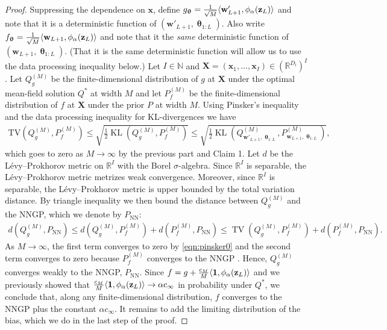 \documentclass[twoside]{article}
\renewcommand{\ss}[1]{_{\text{#1}}}
\newcommand{\vw}{\mathbf{w}}
\newcommand{\vx}{\mathbf{x}}
\newcommand{\vz}{\mathbf{z}}
\newcommand{\vtheta}{\bm{\uptheta}}
\newcommand{\vone}{\mathbf{1}}
\newcommand{\mX}{\mathbf{X}}
\renewcommand{\P}{\mathbb{P}}
\newcommand{\Q}{\mathbb{Q}}
\renewcommand{\Q}{\ensuremath{Q}}
\renewcommand{\P}{\ensuremath{P}}
\newcommand{\R}{\mathbb{R}}
\newcommand{\KL}{\operatorname{KL}}
\renewcommand{\ss}[1]{_{\text{#1}}}        %
\DeclarePairedDelimiter\lra{\langle}{\rangle}    %
\theoremstyle{theoremstyle}
\begin{document}
\begin{proof}
    Suppressing the dependence on $\vx$, define $g_{\vtheta} = \tfrac{1}{\sqrt{M}}\lra{\vw'_{L+1}, \phi_\alpha(\vz_L)}$ and note that it is a deterministic function of $(\vw'_{L+1}, \vtheta_{1:L})$.
    Also write $f_{\vtheta} = \tfrac{1}{\sqrt{M}}\lra{\vw_{L+1}, \phi_\alpha(\vz_L)}$ and note that it the \emph{same} deterministic function of $(\vw_{L+1}, \vtheta_{1:L})$.
    (That it is the same deterministic function will allow us to use the data processing inequality below.)
    Let $I \in \mathbb{N}$ and $\mX = (\vx_1, \ldots, \vx_I) \in (\R^{D\ss{i}})^I$.
    Let $Q^{(M)}_{g}$ be the finite-dimensional distribution of $g$ at $\mX$ under the optimal mean-field solution $Q^*$ at width $M$
    and
    let $P^{(M)}_{f}$ be the finite-dimensional distribution of $f$ at $\mX$ under the prior $P$ at width $M$.
    Using Pinsker's inequality and the data processing inequality for KL-divergences we have
    \begin{align}
        \mathrm{TV}(Q^{(M)}_{g}, P^{(M)}_{f}) \leq \sqrt{\tfrac{1}{2}\KL(Q^{(M)}_{g}, P^{(M)}_{f})} \leq \sqrt{\tfrac{1}{2}\KL(\Q^{(M)}_{\vw'_{L+1}, \vtheta_{1:L}},\P^{(M)}_{\vw_{L+1}, \vtheta_{1:L}})}, \label{eqn:pinsker0}
    \end{align}
    which goes to zero as $M \to \infty$ by the previous part and Claim 1.
    Let $d$ be the L\'evy--Prokhorov metric on $\R^I$ with the Borel $\sigma$-algebra.
    Since $\R^I$ is separable, the L\'evy--Prokhorov metric metrizes weak convergence.
    Moreover, since $\R^I$ is separable, the L\'evy--Prokhorov metric is upper bounded by the total variation distance.
    By triangle inequality we then bound the distance between $Q^{(M)}_{g}$ and the NNGP, which we denote by $P\ss{NN}$:
    \begin{align}
        d(Q^{(M)}_{g}, P\ss{NN})
        \leq
            d(Q^{(M)}_{g}, P^{(M)}_{f})
            + d(P^{(M)}_{f}, P\ss{NN})
        \leq
            \operatorname{TV}(Q^{(M)}_{g}, P^{(M)}_{f})
            + d(P^{(M)}_{f}, P\ss{NN}).
    \end{align}
    As $M \to \infty$, the first term converges to zero by \cref{eqn:pinsker0} and the second term converges to zero because $P_f^{(M)}$ converges to the NNGP \citep{matthews_2018}.
    Hence, $Q^{(M)}_{g}$ converges weakly to the NNGP, $P\ss{NN}$.
    Since $f = g + \tfrac{c_M}{M} \lra{\vone, \phi_\alpha(\vz_L)}$ and we previously showed that $\tfrac{c_M}{M} \lra{\vone, \phi_\alpha(\vz_L)} \to \alpha c_\infty$ in probability under $Q^*$, we conclude that, along any finite-dimensional distribution, $f$ converges to the NNGP plus the constant $\alpha c_\infty$.
    It remains to add the limiting distribution of the bias, which we do in the last step of the proof.
    

\end{proof}
\end{document}
